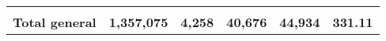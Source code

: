 \begin{tabular}{lrcclr}
	& \multicolumn{1}{l}{}                                           & \multicolumn{1}{l}{}                                       & \multicolumn{1}{l}{} &                                                                     & \multicolumn{1}{l}{}                                                         \\
	\rowcolor[HTML]{DDEBF7} 
	\textbf{Total   general}                                       & \textbf{1,357,075}                                             & \multicolumn{1}{r}{\cellcolor[HTML]{DDEBF7}\textbf{4,258}} & \textbf{40,676}      & \textbf{44,934}                                                     & \textbf{331.11}                                                             
\end{tabular}